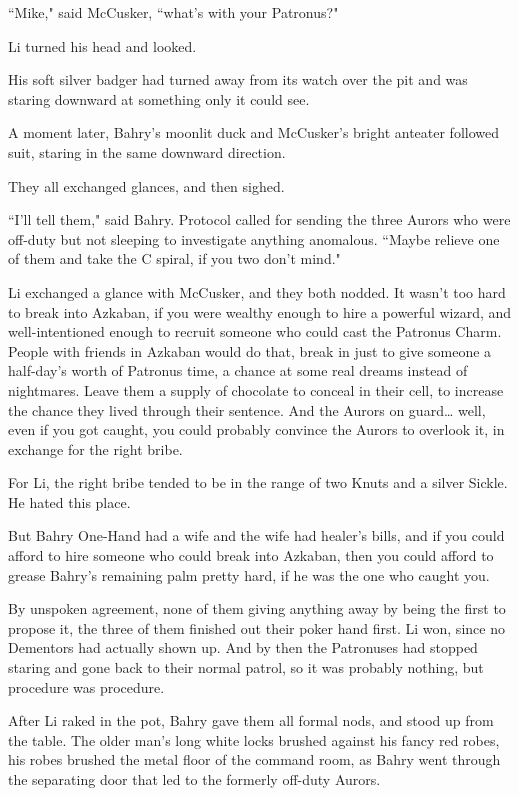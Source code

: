 ``Mike," said McCusker, ``what's with your Patronus?"

Li turned his head and looked.

His soft silver badger had turned away from its watch over the pit and was staring downward at something only it could see.

A moment later, Bahry's moonlit duck and McCusker's bright anteater followed suit, staring in the same downward direction.

They all exchanged glances, and then sighed.

``I'll tell them," said Bahry. Protocol called for sending the three Aurors who were off-duty but not sleeping to investigate anything anomalous. ``Maybe relieve one of them and take the C spiral, if you two don't mind."

Li exchanged a glance with McCusker, and they both nodded. It wasn't too hard to break into Azkaban, if you were wealthy enough to hire a powerful wizard, and well-intentioned enough to recruit someone who could cast the Patronus Charm. People with friends in Azkaban would do that, break in just to give someone a half-day's worth of Patronus time, a chance at some real dreams instead of nightmares. Leave them a supply of chocolate to conceal in their cell, to increase the chance they lived through their sentence. And the Aurors on guard{\ldots} well, even if you got caught, you could probably convince the Aurors to overlook it, in exchange for the right bribe.

For Li, the right bribe tended to be in the range of two Knuts and a silver Sickle. He hated this place.

But Bahry One-Hand had a wife and the wife had healer's bills, and if you could afford to hire someone who could break into Azkaban, then you could afford to grease Bahry's remaining palm pretty hard, if he was the one who caught you.

By unspoken agreement, none of them giving anything away by being the first to propose it, the three of them finished out their poker hand first. Li won, since no Dementors had actually shown up. And by then the Patronuses had stopped staring and gone back to their normal patrol, so it was probably nothing, but procedure was procedure.

After Li raked in the pot, Bahry gave them all formal nods, and stood up from the table. The older man's long white locks brushed against his fancy red robes, his robes brushed the metal floor of the command room, as Bahry went through the separating door that led to the formerly off-duty Aurors.


